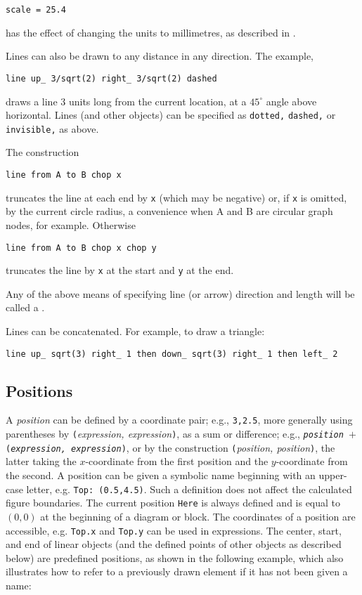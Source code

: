 {\tt scale = 25.4}

\noindent
has the effect of changing the units to millimetres,
as described in .

Lines can also be drawn to any distance in any direction.  The example,

{\tt line up\_ 3/sqrt(2) right\_ 3/sqrt(2) dashed}

\noindent
draws a line 3 units long from the current location,
at a $45^\circ$ angle above horizontal.
Lines (and other objects) can be specified as {\tt dotted,} {\tt dashed,} or
{\tt invisible,} as above.

The construction

{\tt line from A to B chop x}

\noindent
truncates the line at each end by {\tt x} (which may be negative)
or, if {\tt x} is omitted, by
the current circle radius, a convenience when A and B are
circular graph nodes, for example.  Otherwise

{\tt line from A to B chop x chop y}

\noindent
truncates the line by {\tt x} at the start and {\tt y} at the end.

Any of the above means of specifying line (or arrow) direction and length
will be called a \linespec.

Lines can be concatenated.  For example, to draw a triangle:

{\tt line up\_ sqrt(3) right\_ 1 then down\_ sqrt(3) right\_ 1 then left\_ 2}

\subsection{Positions\label{Positions:}}
A {\sl position} can be defined by a coordinate pair;
 e.g., {\tt 3,2.5},
more generally using parentheses by {\tt (}{\sl expression, expression}{\tt )},
as a sum or difference;
 e.g., {\tt{\sl position} $+$ ({\sl expression, expression})},
or by the construction {\tt (}{\sl position, position}{\tt )},
the latter taking the $x$-coordinate from the first
position and the $y$-coordinate from the second.  A position can be
given a symbolic name beginning with an upper-case letter,
e.g. {\tt Top:~(0.5,4.5)}.  Such a definition does not affect the calculated
figure boundaries.  The current position {\tt Here} is always defined and
is equal to $(0,0)$ at the beginning of a diagram or block.
The coordinates of a position are accessible, e.g. {\tt Top.x} and
{\tt Top.y} can be used in expressions.  The center, start, and end of
linear objects (and the defined points of other objects as described below)
are predefined positions, as shown in the following example,
which also illustrates how to refer to a previously drawn element if it has
not been given a name:

